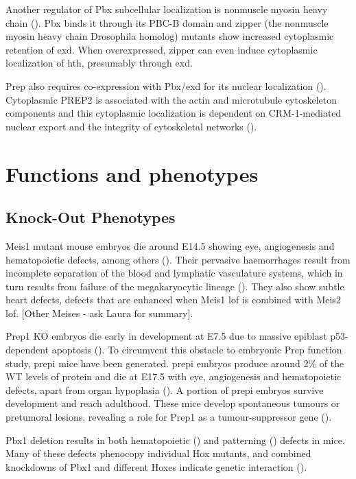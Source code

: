 Another regulator of Pbx subcellular localization is nonmuscle myosin heavy chain (\cite{Huang2003}). Pbx binds it through its PBC-B domain and zipper (the nonmuscle myosin heavy chain Drosophila homolog) mutants show increased cytoplasmic retention of \ac{exd}. When overexpressed, zipper can even induce cytoplasmic localization of \ac{hth}, presumably through \ac{exd}.

Prep also requires co-expression with Pbx/exd for its nuclear localization (\cite{Berthelsen1999}). Cytoplasmic PREP2 is associated with the actin and microtubule cytoskeleton components and this cytoplasmic localization is dependent on CRM-1-mediated nuclear export and the integrity of cytoskeletal networks (\cite{Haller2004}).


\section{Functions and phenotypes}

\subsection{Knock-Out Phenotypes}

Meis1 mutant mouse embryos die around E14.5 showing eye, angiogenesis and hematopoietic defects, among others (\cite{Hisa2004, Azcoitia2005}). Their pervasive haemorrhages result from incomplete separation of the blood and lymphatic vasculature systems, which in turn results from failure of the megakaryocytic lineage (\cite{Carramolino2010}). They also show subtle heart defects, defects that are enhanced when Meis1 \ac{lof} is combined with Meis2 \ac{lof}. [Other Meises - ask Laura for summary]. 

Prep1 \ac{KO} embryos die early in development at E7.5 due to massive epiblast p53-dependent apoptosis (\cite{Fernandez-Diaz2010}). To circumvent this obstacle to embryonic Prep function study, \ac{prepi} mice have been generated. \ac{prepi} embryos produce around 2\% of the \ac{WT} levels of protein and die at E17.5 with eye, angiogenesis and hematopoietic defects, apart from organ hypoplasia (\cite{Ferretti2006}). A portion of \ac{prepi} embryos survive development and reach adulthood. These mice develop spontaneous tumours or pretumoral lesions, revealing a role for Prep1 as a tumour-suppressor gene (\cite{Longobardi2010}).


Pbx1 deletion results in both hematopoietic (\cite{DiMartino2001}) and patterning (\cite{Selleri2001, Moens2006}) defects in mice. Many of these defects phenocopy individual Hox mutants, and combined knockdowns of Pbx1 and different Hoxes indicate genetic interaction (\cite{Moens2006}).

